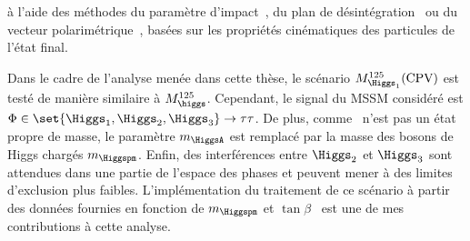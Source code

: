 à l'aide des méthodes du paramètre d'impact~\cite{BERGE2013488}, du plan de désintégration~\cite{Desch_2004} ou du vecteur polarimétrique~\cite{Cherepanov_cpv},
basées sur les propriétés cinématiques des particules de l'état final.
\par
Dans le cadre de l'analyse menée dans cette thèse,
le scénario $M_{\Higgs_1}^{125}(\text{CPV})$ est testé de manière similaire à $M_{\higgs}^{125}$.
Cependant,
le signal du MSSM considéré est
$\Phi\in\set{\Higgs_1,\Higgs_2,\Higgs_3}\to\tau\tau$.
De plus, comme \HiggsA\ n'est pas un état propre de masse,
le paramètre $m_{\HiggsA}$ est remplacé par la masse des bosons de Higgs chargés $m_{\Higgspm}$.
Enfin, des interférences entre $\Higgs_2$ et $\Higgs_3$ sont attendues dans une partie de l'espace des phases et peuvent mener à des limites d'exclusion plus faibles.
L'implémentation du traitement de ce scénario à partir des données fournies en fonction de $m_{\Higgspm}$ et $\tan\beta$~\cite{MSSMneutralHiggsTwiki}
est une de mes contributions à cette analyse.
